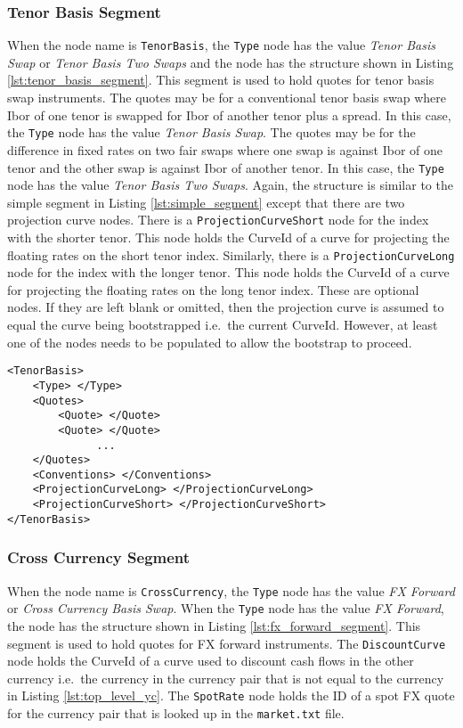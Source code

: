\subsubsection*{Tenor Basis Segment}
When the node name is \lstinline!TenorBasis!, the \lstinline!Type! node has the value \emph{Tenor Basis Swap} or 
\emph{Tenor Basis Two Swaps} and the node has the structure shown in Listing \ref{lst:tenor_basis_segment}. This segment 
is used to hold quotes for tenor basis swap instruments. The quotes may be for a conventional tenor basis swap where Ibor 
of one tenor is swapped for Ibor of another tenor plus a spread. In this case, the \lstinline!Type! node has the value 
\emph{Tenor Basis Swap}. The quotes may be for the difference in fixed rates on two fair swaps where one swap is against 
Ibor of one tenor and the other swap is against Ibor of another tenor. In this case, the \lstinline!Type! node has the 
value \emph{Tenor Basis Two Swaps}. Again, the structure is similar to the simple segment in Listing 
\ref{lst:simple_segment} except that there are two projection curve nodes. There is a \lstinline!ProjectionCurveShort! 
node for the index with the shorter tenor. This node holds the CurveId of a curve for projecting the floating rates on the 
short tenor index. Similarly, there is a \lstinline!ProjectionCurveLong! node for the index with the longer tenor. This 
node holds the CurveId of a curve for projecting the floating rates on the long tenor index. These are optional nodes. If 
they are left blank or omitted, then the projection curve is assumed to equal the curve being bootstrapped i.e.\ the 
current CurveId. However, at least one of the nodes needs to be populated to allow the bootstrap to proceed.

{\footnotesize
\begin{lstlisting}[caption=Tenor basis yield curve segment, label=lst:tenor_basis_segment]
<TenorBasis>
	<Type> </Type>
	<Quotes>
		<Quote> </Quote>
		<Quote> </Quote>
		      ...
	</Quotes>
	<Conventions> </Conventions>
	<ProjectionCurveLong> </ProjectionCurveLong>
	<ProjectionCurveShort> </ProjectionCurveShort>
</TenorBasis>
\end{lstlisting}
}

\subsubsection*{Cross Currency Segment}
When the node name is \lstinline!CrossCurrency!, the \lstinline!Type! node has the value \emph{FX Forward} or \emph{Cross 
Currency Basis Swap}. When the \lstinline!Type! node has the value \emph{FX Forward}, the node has the structure shown in 
Listing \ref{lst:fx_forward_segment}. This segment is used to hold quotes for FX forward instruments. The 
\lstinline!DiscountCurve! node holds the CurveId of a curve used to discount cash flows in the other currency i.e.\ the 
currency in the currency pair that is not equal to the currency in Listing \ref{lst:top_level_yc}. The 
\lstinline!SpotRate! node holds the ID of a spot FX quote for the currency pair that is looked up in the {\tt market.txt} 
file.

